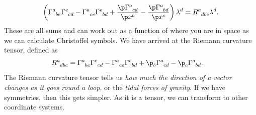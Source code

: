 \documentclass[a4paper, 11pt, normalem]{report}
\begin{document}
\begin{align}
    \left(\tensor{\Gamma}{^a_{be}}\tensor{\Gamma}{^e_{cd}} - \tensor{\Gamma}{^a_{ce}}\tensor{\Gamma}{^e_{bd}} + \frac{\p\tensor{\Gamma}{^a_{cd}}}{\p x^b} - \frac{\p\tensor{\Gamma}{^a_{bd}}}{\p x^c}\right)\lambda^d = \tensor{R}{^a_{dbc}}\lambda^d.
\end{align}
These are all sums and can work out as a function of where you are in space as we can calculate Christoffel symbols. 
We have arrived at the Riemann curvature tensor, defined as
\begin{align}
    \tensor{R}{^a_{dbc}} &= \tensor{\Gamma}{^a_{be}}\tensor{\Gamma}{^e_{cd}} - \tensor{\Gamma}{^a_{ce}}\tensor{\Gamma}{^e_{bd}} + \p_b\tensor{\Gamma}{^a_{cd}} - \p_c\tensor{\Gamma}{^a_{bd}}.
\end{align}
The Riemann curvature tensor tells us \emph{how much the direction of a vector changes as it goes round a loop}, or the \emph{tidal forces of gravity}.
If we have symmetries, then this gets simpler. 
As it is a tensor, we can transform to other coordinate systems. 

\newpage
\end{document}
